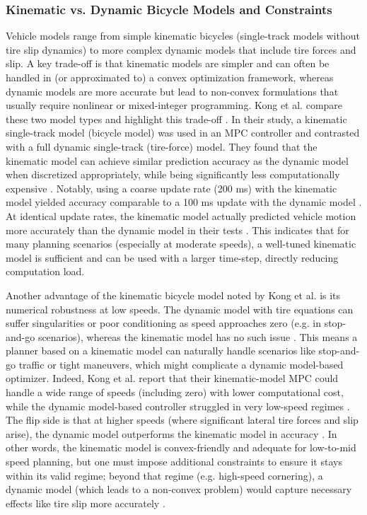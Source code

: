 \subsubsection{Kinematic vs.
	Dynamic Bicycle Models and Constraints}

Vehicle models range from simple kinematic bicycles (single-track models without tire
slip dynamics) to more complex dynamic models that include tire forces and slip.
A key trade-off is that kinematic models are simpler and can often be handled in (or approximated to) a convex optimization framework, whereas
dynamic models are more accurate but lead to non-convex formulations that usually require nonlinear or mixed-integer programming.
Kong et al.
compare these two model types and highlight this trade-off \cite{kong_kinematic_2015}.
In their study, a kinematic single-track model (bicycle model) was used in an MPC controller and contrasted with a full dynamic single-track
(tire-force) model.
They found that the kinematic model can achieve similar prediction accuracy as the dynamic model when discretized appropriately, while being
significantly less computationally expensive \cite{kong_kinematic_2015}.
Notably, using a coarse update rate (200 ms) with the kinematic model yielded accuracy comparable to a 100 ms update with the dynamic model
\cite{kong_kinematic_2015}.
At identical update rates, the kinematic model actually predicted vehicle motion more accurately than the dynamic model in their tests
\cite{kong_kinematic_2015}.
This indicates that for many planning scenarios (especially at moderate speeds), a well-tuned kinematic model is sufficient and can be used with a
larger time-step, directly reducing computation load.

Another advantage of the kinematic bicycle model noted by Kong et al.
is its numerical robustness at low speeds.
The dynamic model with tire equations can suffer singularities or poor conditioning as speed approaches zero (e.g. in stop-and-go scenarios), whereas
the kinematic model has no such issue \cite{kong_kinematic_2015}.
This means a planner based on a kinematic model can naturally handle scenarios like stop-and-go traffic or tight maneuvers, which might complicate a
dynamic model-based optimizer.
Indeed, Kong et al.
report that their kinematic-model MPC could handle a wide range of speeds (including zero) with lower computational cost,
while the dynamic model-based controller struggled in very low-speed regimes \cite{kong_kinematic_2015}.
The flip side is that at higher speeds (where significant lateral tire forces and slip arise), the dynamic model outperforms the kinematic model in
accuracy \cite{kong_kinematic_2015}.
In other words, the kinematic model is convex-friendly and adequate for low-to-mid speed planning, but one must impose additional constraints to
ensure it stays within its valid regime; beyond that regime (e.g. high-speed cornering), a dynamic model (which leads to a non-convex problem) would
capture necessary effects like tire slip more accurately \cite{kong_kinematic_2015}.

